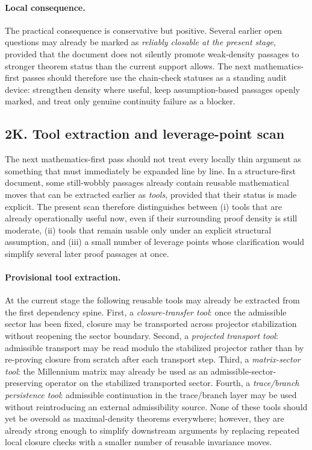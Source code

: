 \documentclass[12pt,a4paper]{article}
\begin{document}
\paragraph{Local consequence.}
The practical consequence is conservative but positive. Several earlier open questions may already be marked as \emph{reliably closable at the present stage}, provided that the document does not silently promote weak-density passages to stronger theorem status than the current support allows. The next mathematics-first passes should therefore use the chain-check statuses as a standing audit device: strengthen density where useful, keep assumption-based passages openly marked, and treat only genuine continuity failure as a blocker.




\subsection*{2K. Tool extraction and leverage-point scan}
The next mathematics-first pass should not treat every locally thin argument as something that must immediately be expanded line by line. In a structure-first document, some still-wobbly passages already contain reusable mathematical moves that can be extracted earlier as \emph{tools}, provided that their status is made explicit. The present scan therefore distinguishes between (i) tools that are already operationally useful now, even if their surrounding proof density is still moderate, (ii) tools that remain usable only under an explicit structural assumption, and (iii) a small number of leverage points whose clarification would simplify several later proof passages at once.

\paragraph{Provisional tool extraction.}
At the current stage the following reusable tools may already be extracted from the first dependency spine. First, a \emph{closure-transfer tool}: once the admissible sector has been fixed, closure may be transported across projector stabilization without reopening the sector boundary. Second, a \emph{projected transport tool}: admissible transport may be read modulo the stabilized projector rather than by re-proving closure from scratch after each transport step. Third, a \emph{matrix-sector tool}: the Millennium matrix may already be used as an admissible-sector-preserving operator on the stabilized transported sector. Fourth, a \emph{trace/branch persistence tool}: admissible continuation in the trace/branch layer may be used without reintroducing an external admissibility source. None of these tools should yet be oversold as maximal-density theorems everywhere; however, they are already strong enough to simplify downstream arguments by replacing repeated local closure checks with a smaller number of reusable invariance moves.
\end{document}
